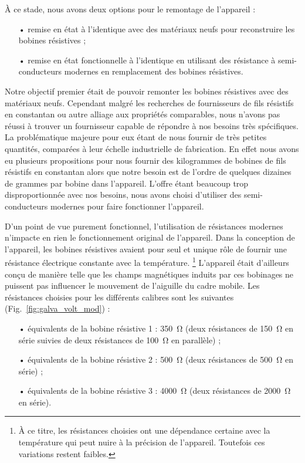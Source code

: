 \documentclass[12pt,a4paper,fleqn]{article}
\begin{document}
À ce stade, nous avons deux options pour le remontage de l'appareil :
\begin{itemize}
\item[•] remise en état à l'identique avec des matériaux neufs pour reconstruire les bobines résistives ;
\item[•] remise en état fonctionnelle à l'identique en utilisant des résistance à semi-conducteurs modernes en remplacement des bobines résistives.
\end{itemize}
Notre objectif premier était de pouvoir remonter les bobines résistives avec des matériaux neufs.
Cependant malgré les recherches de fournisseurs de fils résistifs en constantan ou autre alliage aux propriétés comparables, nous n'avons pas réussi à trouver un fournisseur capable de répondre à nos besoins très spécifiques.
La problématique majeure pour eux étant de nous fournir de très petites quantités, comparées à leur échelle industrielle de fabrication.
En effet nous avons eu plusieurs propositions pour nous fournir des kilogrammes de bobines de fils résistifs en constantan alors que notre besoin est de l'ordre de quelques dizaines de grammes par bobine dans l'appareil.
L'offre étant beaucoup trop disproportionnée avec nos besoins, nous avons choisi d'utiliser des semi-conducteurs modernes pour faire fonctionner l'appareil.

D'un point de vue purement fonctionnel, l'utilisation de résistances modernes n'impacte en rien le fonctionnement original de l'appareil.
Dans la conception de l'appareil, les bobines résistives avaient pour seul et unique rôle de fournir une résistance électrique constante avec la température.
\footnote{À ce titre, les résistances choisies ont une dépendance certaine avec la température qui peut nuire à la précision de l'appareil.
Toutefois ces variations restent faibles.}
L'appareil était d'ailleurs conçu de manière telle que les champs magnétiques induits par ces bobinages ne puissent pas influencer le mouvement de l'aiguille du cadre mobile.
Les résistances choisies pour les différents calibres sont les suivantes (Fig.~\ref{fig:galva_volt_mod}) :
\begin{itemize}
\item[•] équivalents de la bobine résistive 1 : \qty{350}{\ohm} (deux résistances de \qty{150}{\ohm} en série suivies de deux résistances de \qty{100}{\ohm} en parallèle) ;
\item[•] équivalents de la bobine résistive 2 : \qty{500}{\ohm} (deux résistances de \qty{500}{\ohm} en série) ;
\item[•] équivalents de la bobine résistive 3 : \qty{4000}{\ohm} (deux résistances de \qty{2000}{\ohm} en série).
\end{itemize}
\end{document}
